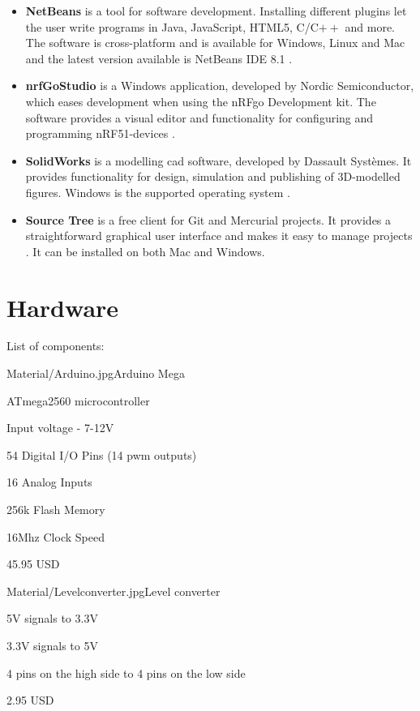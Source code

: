 \begin{itemize}
    \item \textbf{NetBeans} is a tool for software development. Installing different plugins let the user write programs in Java, JavaScript, HTML5, C/C$++$ and more. The software is cross-platform and is available for Windows, Linux and Mac and the latest version available is NetBeans IDE 8.1 \cite{netbeans}.
    \item \textbf{nrfGoStudio} is a Windows application, developed by Nordic Semiconductor, which eases development when using the nRFgo Development kit. The software provides a visual editor and functionality for configuring and programming nRF51-devices \cite{nrfgo}.
    \item \textbf{SolidWorks} is a modelling \acrshort{cad} software, developed by Dassault Systèmes. It provides functionality for design, simulation and publishing of 3D-modelled figures. Windows is the supported operating system \cite{solidworks}.
    \item \textbf{Source Tree} is a free client for Git and Mercurial projects. It provides a straightforward graphical user interface and makes it easy to manage projects \cite{sourcetree}. It can be installed on both Mac and Windows.
\end{itemize}
\newpage
\section{Hardware}
\label{sec:hardware}
List of components:
\begin{material}{Material/Arduino.jpg}{Arduino Mega}
\item ATmega2560 microcontroller
\item Input voltage - 7-12V
\item 54 Digital I/O Pins (14 \acrfull{pwm} outputs)
\item 16 Analog Inputs
\item 256k Flash Memory
\item 16Mhz Clock Speed
\item 45.95 USD
\end{material}

\begin{material}{Material/Levelconverter.jpg}{Level converter}
\item 5V signals to 3.3V 
\item 3.3V signals to 5V
\item 4 pins on the high side to 4 pins on the low side
\item 2.95 USD
\end{material}

